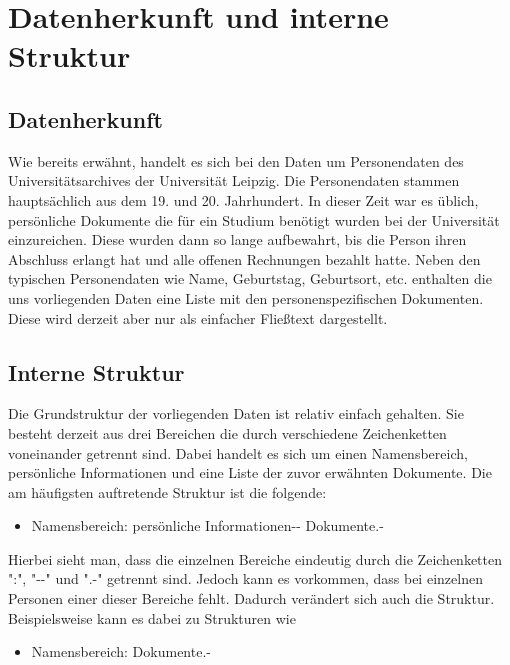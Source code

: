 \section{Datenherkunft und interne Struktur}
 \label{sec:Datenherkunft und interne Struktur}
 
\subsection{Datenherkunft}
 \label{subsec:Datenherkunft}
 
Wie bereits erwähnt, handelt es sich bei den Daten um Personendaten des Universitätsarchives der Universität Leipzig. Die Personendaten stammen hauptsächlich aus dem 19. und 20. Jahrhundert. In dieser Zeit war es üblich, persönliche Dokumente die für ein Studium benötigt wurden bei der Universität einzureichen. Diese wurden dann so lange aufbewahrt, bis die Person ihren Abschluss erlangt hat und alle offenen Rechnungen bezahlt hatte. Neben den typischen Personendaten wie Name, Geburtstag, Geburtsort, etc. enthalten die uns vorliegenden Daten eine Liste mit den personenspezifischen Dokumenten. Diese wird derzeit aber nur als einfacher Fließtext dargestellt.

\subsection{Interne Struktur} 
 \label{subsec:Interne Struktur}
 
Die Grundstruktur der vorliegenden Daten ist relativ einfach gehalten. Sie besteht derzeit aus drei Bereichen die durch verschiedene Zeichenketten voneinander getrennt sind. Dabei handelt es sich um einen Namensbereich, persönliche Informationen und eine Liste der zuvor erwähnten Dokumente. Die am häufigsten auftretende Struktur ist die folgende: 

\begin{itemize}
 \item Namensbereich: persönliche Informationen-{}- Dokumente.-
\end{itemize}

\noindent
Hierbei sieht man, dass die einzelnen Bereiche eindeutig durch die Zeichenketten "{}:"{}, "{}-{}-"{} und "{}.-"{} getrennt sind. Jedoch kann es vorkommen, dass bei einzelnen Personen einer dieser Bereiche fehlt. Dadurch verändert sich auch die Struktur. Beispielsweise kann es dabei zu Strukturen wie

\begin{itemize}
 \item Namensbereich: Dokumente.-
\end{itemize}

